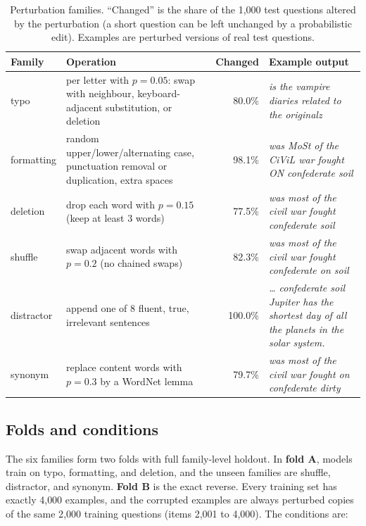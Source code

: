 \documentclass[11pt]{article}
\newcommand{\pfam}[1]{\textsf{#1}}
\begin{document}
\begin{table}[t]
\centering
\small
\caption{Perturbation families. ``Changed'' is the share of the 1{,}000 test questions altered by the perturbation (a short question can be left unchanged by a probabilistic edit). Examples are perturbed versions of real test questions.}
\label{tab:families}
\begin{tabular}{@{}l p{4.6cm} r p{5.2cm}@{}}
\toprule
Family & Operation & Changed & Example output \\
\midrule
\pfam{typo} & per letter with $p{=}0.05$: swap with neighbour, keyboard-adjacent substitution, or deletion & 80.0\% & \emph{is the vampire diaries related to the originalz} \\
\pfam{formatting} & random upper/lower/alternating case, punctuation removal or duplication, extra spaces & 98.1\% & \emph{was MoSt of the CiViL war fought ON confederate soil} \\
\pfam{deletion} & drop each word with $p{=}0.15$ (keep at least 3 words) & 77.5\% & \emph{was most of the civil war fought confederate soil} \\
\pfam{shuffle} & swap adjacent words with $p{=}0.2$ (no chained swaps) & 82.3\% & \emph{was most of the civil war fought confederate on soil} \\
\pfam{distractor} & append one of 8 fluent, true, irrelevant sentences & 100.0\% & \emph{\ldots{} confederate soil Jupiter has the shortest day of all the planets in the solar system.} \\
\pfam{synonym} & replace content words with $p{=}0.3$ by a WordNet \citep{miller1995wordnet} lemma & 79.7\% & \emph{was most of the civil war fought on confederate dirty} \\
\bottomrule
\end{tabular}
\end{table}

\subsection{Folds and conditions}

The six families form two folds with full family-level holdout. In \textbf{fold A}, models train on \pfam{typo}, \pfam{formatting}, and \pfam{deletion}, and the unseen families are \pfam{shuffle}, \pfam{distractor}, and \pfam{synonym}. \textbf{Fold B} is the exact reverse. Every training set has exactly 4{,}000 examples, and the corrupted examples are always perturbed copies of the same 2{,}000 training questions (items 2{,}001 to 4{,}000). The conditions are:
\end{document}
